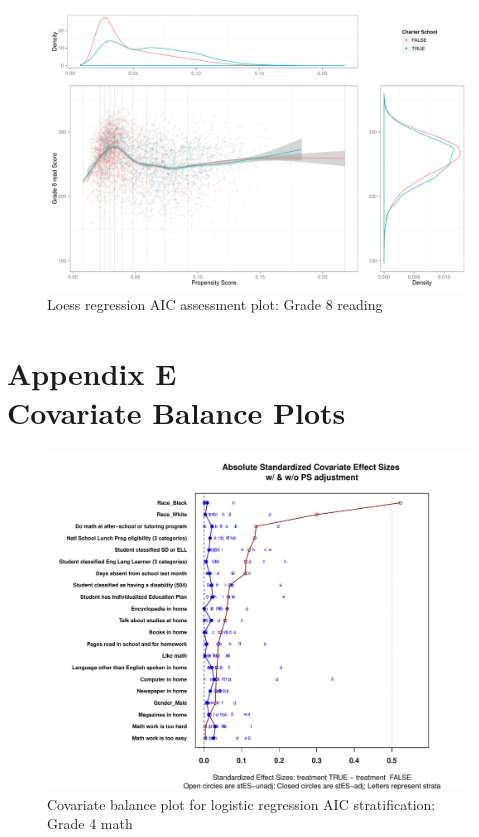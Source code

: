 \begin{figure}[h!]
\begin{center}
\includegraphics[height=.4\textheight]{../Figures2009/g8read-loessAIC.pdf}
\caption{Loess regression AIC assessment plot: Grade 8 reading}
\label{fig:g8read:loess}
\end{center}
\end{figure}


\clearpage
{}
\section*{Appendix E\\Covariate Balance Plots}


\begin{figure}[h!]
\begin{center}
\includegraphics[width=\textwidth]{../Figures2009/g4math-lrAIC-balance.pdf}
\caption{Covariate balance plot for logistic regression AIC stratification: Grade 4 math}
\end{center}
\end{figure}

